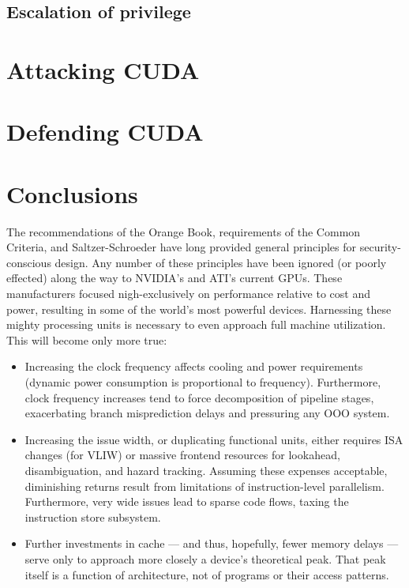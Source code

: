 \documentclass[letterpaper,10pt]{article}
\begin{document}
\begin{multicols}{2}
\subsection{Escalation of privilege}

\section{Attacking CUDA}

\section{Defending CUDA}

\section{Conclusions} 
The recommendations of the Orange Book\cite{orangebook}, requirements of the Common Criteria\cite{ccrit},
and Saltzer-Schroeder\cite{principles} have long provided general principles for
security-conscious design. Any number of these principles have been ignored
(or poorly effected) along the way to NVIDIA's and ATI's current GPUs. These
manufacturers focused nigh-exclusively on performance relative to cost and
power, resulting in some of the world's most powerful devices. Harnessing these
mighty processing units is necessary to even approach full machine utilization.
This will become only more true:
\begin{itemize}
\item Increasing the clock frequency affects cooling and power requirements
(dynamic power consumption is proportional to frequency). Furthermore,
clock frequency increases tend to force decomposition of pipeline
stages, exacerbating branch misprediction delays and pressuring any OOO
system\cite{cormean}.
\item Increasing the issue width, or duplicating functional units, either
requires ISA changes (for VLIW) or massive frontend resources for lookahead,
disambiguation, and hazard tracking. Assuming these expenses acceptable,
diminishing returns result from limitations of instruction-level parallelism.
Furthermore, very wide issues lead to sparse code flows, taxing the instruction
store subsystem. 
\item Further investments in cache --- and thus, hopefully, fewer memory
delays --- serve only to approach more closely a device's theoretical peak.
That peak itself is a function of architecture, not of programs or their
access patterns.

\end{itemize}
\end{multicols}
\end{document}
